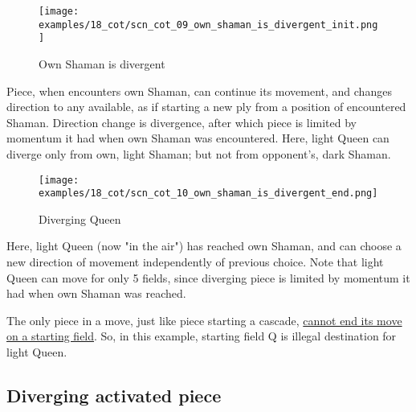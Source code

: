 \vspace*{-1.4\baselineskip}
\noindent
\begin{figure}[!h]
\texttt{[image: examples/18\_cot/scn\_cot\_09\_own\_shaman\_is\_divergent\_init.png]}
\vspace*{-1.3\baselineskip}
\caption{Own Shaman is divergent}
\label{fig:scn_cot_09_own_shaman_is_divergent_init}
\end{figure}

\vspace*{-0.5\baselineskip}
Piece, when encounters own Shaman, can continue its movement, and changes direction
to any available, as if starting a new ply from a position of encountered Shaman.
Direction change is divergence, after which piece is limited by momentum it had when
own Shaman was encountered. \newline
\indent
Here, light Queen can diverge only from own, light Shaman; but not from opponent's,
dark Shaman.

\clearpage %

\vspace*{-2.1\baselineskip}
\noindent
\begin{figure}[!h]
\texttt{[image: examples/18\_cot/scn\_cot\_10\_own\_shaman\_is\_divergent\_end.png]}
\vspace*{-1.3\baselineskip}
\caption{Diverging Queen}
\label{fig:scn_cot_10_own_shaman_is_divergent_end}
\end{figure}

\vspace*{-0.4\baselineskip}
Here, light Queen (now "in the air") has reached own Shaman, and can choose a new
direction of movement independently of previous choice. Note that light Queen can
move for only 5 fields, since diverging piece is limited by momentum it had when
own Shaman was reached.

The only piece in a move, just like piece starting a cascade,
\hyperref[fig:scn_mv_46_static_move_is_illegal_init]{cannot end its move on a starting field}.
So, in this example, starting field Q is illegal destination for light Queen.

\clearpage %

\subsection*{Diverging activated piece}
\label{sec:Conquest of Tlalocan/Divergence/Diverging activated piece}

